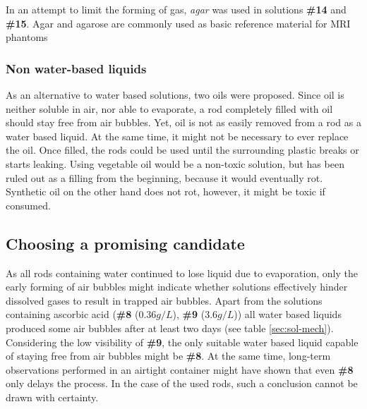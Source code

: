 In an attempt to limit the forming of gas, \textit{agar} was used in solutions \textbf{\#14} and \textbf{\#15}.
Agar and agarose are commonly used as basic reference material for MRI phantoms \cite{BuccioliniCiraolo1989, Mathur-DeVre1985}

\subsubsection{Non water-based liquids}
As an alternative to water based solutions, two oils were proposed.
Since oil is neither soluble in air, nor able to evaporate, a rod completely filled with oil should stay free from air bubbles.
Yet, oil is not as easily removed from a rod as a water based liquid.
At the same time, it might not be necessary to ever replace the oil.
Once filled, the rods could be used until the surrounding plastic breaks or starts leaking.
Using vegetable oil would be a non-toxic solution, but has been ruled out as a filling from the beginning, because it would eventually rot.
Synthetic oil on the other hand does not rot, however, it might be toxic if consumed.


\subsection{Choosing a promising candidate}
As all rods containing water continued to lose liquid due to evaporation, only the early forming of air bubbles might indicate whether solutions effectively hinder dissolved gases to result in trapped air bubbles.
Apart from the solutions containing ascorbic acid (\textbf{\#8} ($0.36 g/L$), \textbf{\#9} ($3.6 g/L$)) all water based liquids produced some air bubbles after at least two days (see table \ref{sec:sol-mech}).
Considering the low visibility of \textbf{\#9}, the only suitable water based liquid capable of staying free from air bubbles might be \textbf{\#8}.
At the same time, long-term observations performed in an airtight container might have shown that even \textbf{\#8} only delays the process.
In the case of the used rods, such a conclusion cannot be drawn with certainty.

